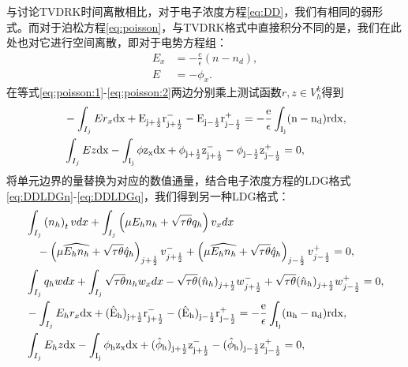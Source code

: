 与讨论TVDRK时间离散相比，对于电子浓度方程\eqref{eq:DD}，我们有相同的弱形式。而对于泊松方程\eqref{eq:poisson}，与TVDRK格式中直接积分不同的是，我们在此处也对它进行空间离散，即对于电势方程组：
\begin{align}
	E_x & = -\frac{e}{\epsilon}(n-n_d), \label{eq:poisson:1} \\
	E   & = - \phi_x. \label{eq:poisson:2}
\end{align}
在等式\eqref{eq:poisson:1}-\eqref{eq:poisson:2}两边分别乘上测试函数$r,z\in V^k_h$得到
\begin{align}
	 & -\int_{I_j}Er_x\rm{d}x + E_{j+\frac{1}{2}}r_{j+\frac{1}{2}}^- - E_{j-\frac{1}{2}}r_{j-\frac{1}{2}}^+ = -\frac{e}{\epsilon}\int_{I_j}(n-n_d)r\rm{d}x,                                       \label{DD:weakform:E} \\
	 & \int_{I_j} Ez \rm{d}x - \int_{I_j}\phi z_x \rm{d}x + \phi_{j+\frac{1}{2}}z_{j+\frac{1}{2}}^- - \phi_{j-\frac{1}{2}}z_{j-\frac{1}{2}}^+ = 0, \label{DD:weakform:phi}
\end{align}
将单元边界的量替换为对应的数值通量，结合电子浓度方程的LDG格式\eqref{eq:DDLDGn}-\eqref{eq:DDLDGq}，我们得到另一种LDG格式：
\begin{align}
	 & \int_{I_{j}}\left(n_h\right)_{t} v d x+\int_{I_{j}}\left(\mu E_h n_h+\sqrt{\tau \theta} q_h\right) v_{x} d x      \nonumber                                                                                                                       \\
	 & \quad-\left(\mu \widehat{E_h n_h}+\sqrt{\tau \theta} \hat{q}_{h}\right)_{j+\frac{1}{2}} v_{j+\frac{1}{2}}^{-}+\left(\mu \widehat{E_h n_h}+\sqrt{\tau \theta} \hat{q}_{h}\right)_{j-\frac{1}{2}} v_{j-\frac{1}{2}}^{+}=0, \label{eq:IMEX:DD:n}     \\
	 & \int_{I_{j}} q_h w d x+\int_{I_{j}} \sqrt{\tau \theta} n_h w_{x} d x-\sqrt{\tau \theta} (\hat{n}_h)_{j+\frac{1}{2}} w_{j+\frac{1}{2}}^{-}+\sqrt{\tau \theta} (\hat{n}_h)_{j+\frac{1}{2}} w_{j-\frac{1}{2}}^{+}=0,            \label{eq:IMEX:DD:q} \\
	 & -\int_{I_j}E_hr_x\rm{d}x + (\hat{E}_h)_{j+\frac{1}{2}}r_{j+\frac{1}{2}}^- - (\hat{E}_h)_{j-\frac{1}{2}}r_{j-\frac{1}{2}}^+ = -\frac{e}{\epsilon}\int_{I_j}(n_h-n_d)r\rm{d}x,                                        \label{eq:IMEX:poisson:1}     \\
	 & \int_{I_j} E_hz \rm{d}x - \int_{I_j}\phi_h z_x \rm{d}x + (\hat{\phi}_h)_{j+\frac{1}{2}}z_{j+\frac{1}{2}}^- - (\hat{\phi}_h)_{j-\frac{1}{2}}z_{j-\frac{1}{2}}^+ = 0,\label{eq:IMEX:poisson:2}
\end{align}
